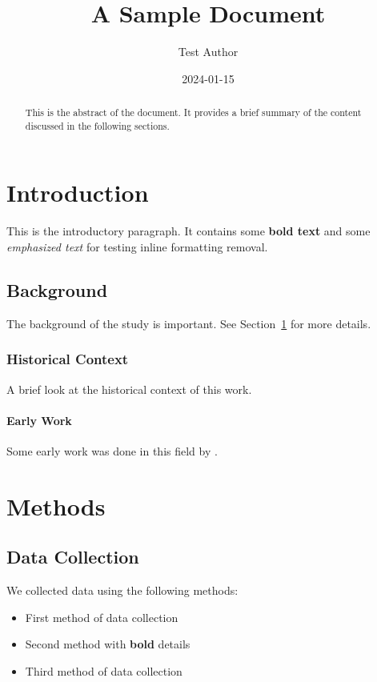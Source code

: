 \documentclass{article}
\title{A Sample Document}
\author{Test Author}
\date{2024-01-15}
\begin{document}
\maketitle

\begin{abstract}
This is the abstract of the document. It provides a brief summary
of the content discussed in the following sections.
\end{abstract}

\section{Introduction}
\label{sec:intro}

This is the introductory paragraph. It contains some \textbf{bold text}
and some \emph{emphasized text} for testing inline formatting removal.


\subsection{Background}

The background of the study is important. See Section~\ref{sec:intro}
for more details.

\subsubsection{Historical Context}

A brief look at the historical context of this work.

\paragraph{Early Work}

Some early work was done in this field by \cite{knuth1984}.

\section{Methods}

\subsection{Data Collection}

We collected data using the following methods:

\begin{itemize}
  \item First method of data collection
  \item Second method with \textbf{bold} details
  \item Third method of data collection
\end{itemize}
\end{document}
